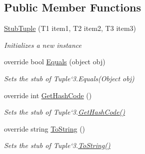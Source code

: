 \subsection*{Public Member Functions}
\begin{DoxyCompactItemize}
\item 
\hyperlink{class_system_1_1_fakes_1_1_stub_tuple_3_01_t1_00_01_t2_00_01_t3_01_4_aa64d03f8d445980f32476cbba4aaa862}{Stub\-Tuple} (T1 item1, T2 item2, T3 item3)
\begin{DoxyCompactList}\small\item\em Initializes a new instance\end{DoxyCompactList}\item 
override bool \hyperlink{class_system_1_1_fakes_1_1_stub_tuple_3_01_t1_00_01_t2_00_01_t3_01_4_ac89c74edd15feffdc05bc5490eda65b2}{Equals} (object obj)
\begin{DoxyCompactList}\small\item\em Sets the stub of Tuple`3.Equals(\-Object obj)\end{DoxyCompactList}\item 
override int \hyperlink{class_system_1_1_fakes_1_1_stub_tuple_3_01_t1_00_01_t2_00_01_t3_01_4_a4143fac8a7eb9056474428f11df991aa}{Get\-Hash\-Code} ()
\begin{DoxyCompactList}\small\item\em Sets the stub of Tuple`3.\hyperlink{class_system_1_1_fakes_1_1_stub_tuple_3_01_t1_00_01_t2_00_01_t3_01_4_a4143fac8a7eb9056474428f11df991aa}{Get\-Hash\-Code()}\end{DoxyCompactList}\item 
override string \hyperlink{class_system_1_1_fakes_1_1_stub_tuple_3_01_t1_00_01_t2_00_01_t3_01_4_a0da1e81ee8fdc2cc26daf43d40ced721}{To\-String} ()
\begin{DoxyCompactList}\small\item\em Sets the stub of Tuple`3.\hyperlink{class_system_1_1_fakes_1_1_stub_tuple_3_01_t1_00_01_t2_00_01_t3_01_4_a0da1e81ee8fdc2cc26daf43d40ced721}{To\-String()}\end{DoxyCompactList}\end{DoxyCompactItemize}
